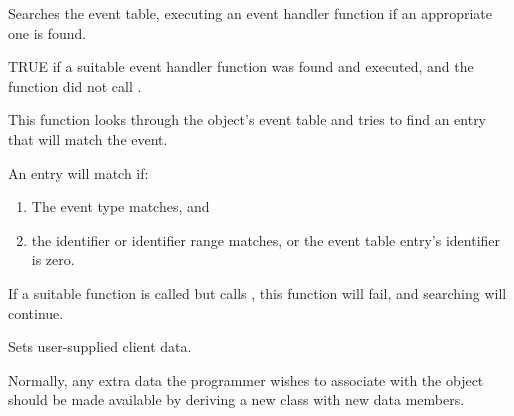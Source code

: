 Searches the event table, executing an event handler function if an appropriate one
is found.





TRUE if a suitable event handler function was found and executed, and the function did not
call .


This function looks through the object's event table and tries to find an entry
that will match the event.

An entry will match if:

\begin{enumerate}\itemsep=0pt
\item The event type matches, and
\item the identifier or identifier range matches, or the event table entry's identifier is zero.
\end{enumerate}

If a suitable function is called but calls , this function will
fail, and searching will continue.



\label{wxevthandlersetclientdata}


Sets user-supplied client data.




Normally, any extra data the programmer wishes
to associate with the object should be made available by deriving a new class
with new data members.



\label{wxevthandlersetevthandlerenabled}

